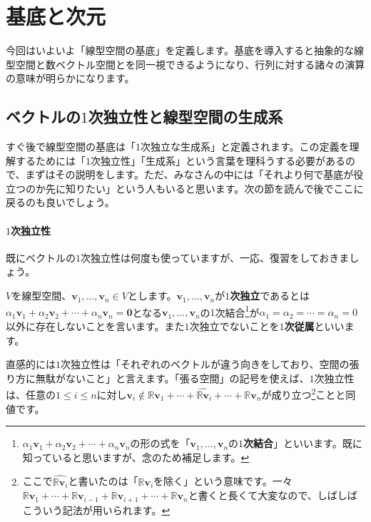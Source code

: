 \section{基底と次元}

今回はいよいよ「線型空間の基底」を定義します。基底を導入すると抽象的な線型空間と数ベクトル空間とを同一視できるようになり、行列に対する諸々の演算の意味が明らかになります。

\subsection{ベクトルの$1$次独立性と線型空間の生成系}

すぐ後で線型空間の基底は「$1$次独立な生成系」と定義されます。この定義を理解するためには「$1$次独立性」「生成系」という言葉を理科うする必要があるので、まずはその説明をします。ただ、みなさんの中には「それより何で基底が役立つのか先に知りたい」という人もいると思います。次の節を読んで後でここに戻るのも良いでしょう。

\paragraph{$1$次独立性} 既にベクトルの$1$次独立性は何度も使っていますが、一応、復習をしておきましょう。

$V$を線型空間、$\bm{v}_1, \ldots, \bm{v}_n \in V$とします。$\bm{v}_1, \ldots, \bm{v}_n$が\textbf{$1$次独立}であるとは$\alpha_1 \bm{v}_1 + \alpha_2 \bm{v}_2 + \cdots + \alpha_n \bm{v}_n = \bm{0}$となる$\bm{v}_1, \ldots, \bm{v}_n$の$1$次結合\footnote{$\alpha_1 \bm{v}_1 + \alpha_2 \bm{v}_2 + \cdots + \alpha_n \bm{v}_n$の形の式を「$\bm{v}_1, \ldots, \bm{v}_n$の\textbf{$1$次結合}」といいます。既に知っていると思いますが、念のため補足します。}が$\alpha_1 = \alpha_2 = \cdots = \alpha_n = 0$以外に存在しないことを言います。また$1$次独立でないことを\textbf{$1$次従属}といいます。

直感的には$1$次独立性は「それぞれのベクトルが違う向きをしており、空間の張り方に無駄がないこと」と言えます。「張る空間」の記号を使えば、$1$次独立性は、任意の$1\leq i \leq n$に対し$\bm{v}_i \not\in \mathbb{R}\bm{v}_1 + \cdots + \hat{\mathbb{R}\bm{v}_i} + \cdots + \mathbb{R}\bm{v}_n$が成り立つ\footnote{ここで$\hat{\mathbb{R}\bm{v}_i}$と書いたのは「$\mathbb{R}\bm{v}_i$を除く」という意味です。一々$\mathbb{R}\bm{v}_1 +\cdots + \mathbb{R}\bm{v}_{i - 1} + \mathbb{R}\bm{v}_{i + 1} + \cdots + \mathbb{R}\bm{v}_n$と書くと長くて大変なので、しばしばこういう記法が用いられます。}ことと同値です。

